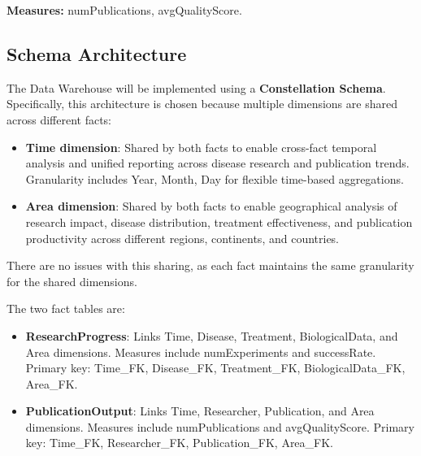 \documentclass[11pt,a4paper]{article}
\begin{document}
\textbf{Measures:} numPublications, avgQualityScore.

\subsection{Schema Architecture}

The Data Warehouse will be implemented using a \textbf{Constellation Schema}. Specifically, this architecture is chosen because multiple dimensions are shared across different facts:

\begin{itemize}
    \item \textbf{Time dimension}: Shared by both facts to enable cross-fact temporal analysis and unified reporting across disease research and publication trends. Granularity includes Year, Month, Day for flexible time-based aggregations.
    
    \item \textbf{Area dimension}: Shared by both facts to enable geographical analysis of research impact, disease distribution, treatment effectiveness, and publication productivity across different regions, continents, and countries.
\end{itemize}

There are no issues with this sharing, as each fact maintains the same granularity for the shared dimensions.

The two fact tables are:

\begin{itemize}
    \item \textbf{ResearchProgress}: Links Time, Disease, Treatment, BiologicalData, and Area dimensions. Measures include numExperiments and successRate. Primary key: Time\_FK, Disease\_FK, Treatment\_FK, BiologicalData\_FK, Area\_FK.
    
    \item \textbf{PublicationOutput}: Links Time, Researcher, Publication, and Area dimensions. Measures include numPublications and avgQualityScore. Primary key: Time\_FK, Researcher\_FK, Publication\_FK, Area\_FK.
\end{itemize}
\end{document}

